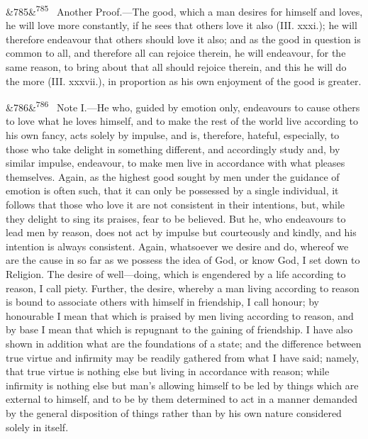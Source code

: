 \documentclass[12pt]{article}
\newcommand{\para}[1][]{\par\noindent\ifx&#1&\else\textsuperscript{\footnotesize #1}~\fi}
\begin{document}
\para[785] Another Proof.---The good, which a man desires for himself and loves, he will love more constantly, if he sees that others love it also (III. xxxi.); he will therefore endeavour that others should love it also; and as the good in question is common to all, and therefore all can rejoice therein, he will endeavour, for the same reason, to bring about that all should rejoice therein, and this he will do the more (III. xxxvii.), in proportion as his own enjoyment of the good is greater.

\para[786] Note I.---He who, guided by emotion only, endeavours to cause others to love what he loves himself, and to make the rest of the world live according to his own fancy, acts solely by impulse, and is, therefore, hateful, especially, to those who take delight in something different, and accordingly study and, by similar impulse, endeavour, to make men live in accordance with what pleases themselves. Again, as the highest good sought by men under the guidance of emotion is often such, that it can only be possessed by a single individual, it follows that those who love it are not consistent in their intentions, but, while they delight to sing its praises, fear to be believed. But he, who endeavours to lead men by reason, does not act by impulse but courteously and kindly, and his intention is always consistent. Again, whatsoever we desire and do, whereof we are the cause in so far as we possess the idea of God, or know God, I set down to Religion. The desire of well---doing, which is engendered by a life according to reason, I call piety. Further, the desire, whereby a man living according to reason is bound to associate others with himself in friendship, I call honour; by honourable I mean that which is praised by men living according to reason, and by base I mean that which is repugnant to the gaining of friendship. I have also shown in addition what are the foundations of a state; and the difference between true virtue and infirmity may be readily gathered from what I have said; namely, that true virtue is nothing else but living in accordance with reason; while infirmity is nothing else but man's allowing himself to be led by things which are external to himself, and to be by them determined to act in a manner demanded by the general disposition of things rather than by his own nature considered solely in itself.
\end{document}
